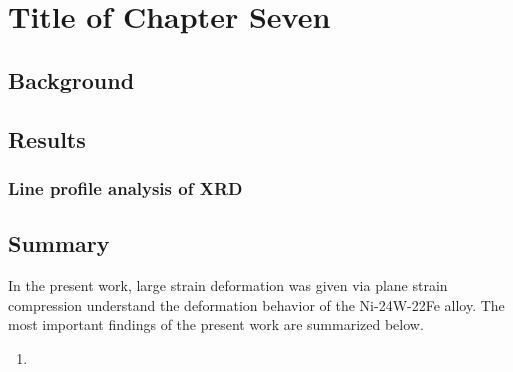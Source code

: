 
\chapter{Title of Chapter Seven}

\label{Chapter7} %


\section{Background}

\lipsum[1]

\section{Results}

\subsection{Line profile analysis of XRD}
\lipsum[1]

\section{Summary}
In the present work, large strain deformation was given via plane strain compression understand the deformation behavior of the Ni-24W-22Fe alloy. The most important findings of the present work are summarized below.
\begin{enumerate}
    \item \lipsum[1]    
\end{enumerate}